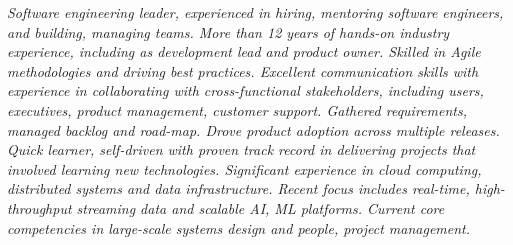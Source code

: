 {\selectfont
	\begin{justify}\textit{Software engineering leader, experienced in hiring, mentoring software engineers, and building, managing teams. More than 12 years of hands-on industry experience, including as development lead and product owner. Skilled in Agile methodologies and driving best practices. Excellent communication skills with experience in collaborating with cross-functional stakeholders, including users, executives, product management, customer support. Gathered requirements, managed backlog and road-map. Drove product adoption across multiple releases. Quick learner, self-driven with proven track record in delivering projects that involved learning new technologies. Significant experience in cloud computing, distributed systems and data infrastructure. Recent focus includes real-time, high-throughput streaming data and scalable AI, ML platforms. Current core competencies in large-scale systems design and people, project management.}\end{justify}
}